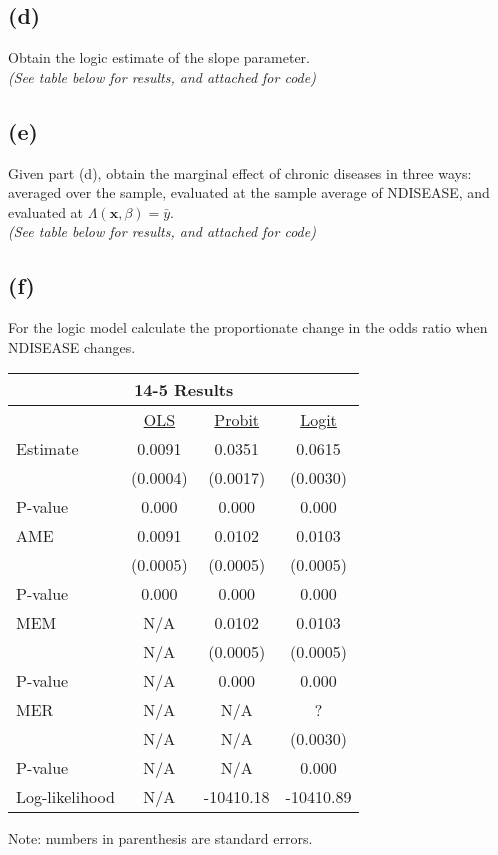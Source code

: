 \documentclass[11pt]{article}
\theoremstyle{definition}
\begin{document}
\subsection*{(d)}
Obtain the logic estimate of the slope parameter. \\
\textit{(See table below for results, and attached for code)}
\subsection*{(e)}
Given part (d), obtain the marginal effect of chronic diseases in three ways: averaged over the sample, evaluated at the sample average of NDISEASE, and evaluated at $\Lambda(\boldsymbol{x},\beta)=\bar{y}$. \\
\textit{(See table below for results, and attached for code)}
\subsection*{(f)}
For the logic model calculate the proportionate change in the odds ratio when NDISEASE changes.

\vspace{2.5mm}
\noindent
\begin{center}
\begin{tabular}{l c c c}
\hline\hline
\multicolumn{4}{c}{\textbf{14-5 Results}} \\
\hline\hline 
 & \underline{OLS} & \underline{Probit} & \underline{Logit} \\
Estimate & 0.0091 & 0.0351 & 0.0615 \\ 
 & (0.0004) & (0.0017) & (0.0030) \\
P-value & 0.000 & 0.000 & 0.000 \\ 
AME & 0.0091 & 0.0102 & 0.0103 \\
& (0.0005) & (0.0005) & (0.0005) \\
P-value & 0.000 & 0.000 & 0.000 \\
MEM & N/A & 0.0102 & 0.0103 \\
& N/A & (0.0005) & (0.0005) \\
P-value & N/A & 0.000 & 0.000 \\
MER & N/A & N/A & ? \\
& N/A & N/A & (0.0030) \\
P-value & N/A & N/A & 0.000 \\
Log-likelihood & N/A & -10410.18 & -10410.89 \\
\hline\hline
\end{tabular} 
\end{center} 
Note: numbers in parenthesis are standard errors.
\end{document}
